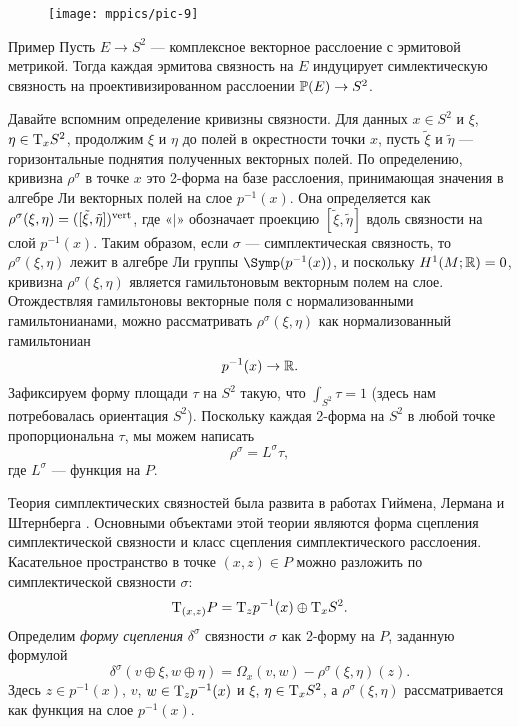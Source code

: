 {

\begin{wrapfigure}[12]{o}{40 mm}
\vskip-0mm
\centering
\texttt{[image: mppics/pic-9]}
\caption{}\label{pic-9}
\vskip0mm
\end{wrapfigure}

\begin{ex*}{Пример}
Пусть $E \to S^2$ — комплексное векторное расслоение с эрмитовой метрикой.
Тогда каждая эрмитова связность на $E$ индуцирует симлектическую связность на проективизированном расслоении $\PP(E)\z\to S^2$.
\end{ex*}

Давайте вспомним определение кривизны связности.
Для данных $x\in S^2$ и $\xi$, $\eta \z\in \T_x S^2$, продолжим $\xi$
и $\eta$ до полей в окрестности точки $x$, 
пусть $\tilde\xi$ и $\tilde\eta$ — горизонтальные поднятия
полученных векторных полей. 
По определению, кривизна $\rho^\sigma$ в точке $x$ это 2-форма на
базе расслоения,
принимающая значения в алгебре Ли векторных полей на слое
$p^{-1}(x)$. 
Она определяется как $\rho^\sigma (\xi, \eta) \z= ([\tilde\xi,
  \tilde\eta])^\vert$, где «$\vert$» обозначает проекцию $[\tilde\xi,
  \tilde\eta]$ вдоль связности на слой $p^{-1} (x)$. 
Таким образом, если $\sigma$ — симплектическая связность, то
$\rho^\sigma (\xi, \eta)$ лежит в алгебре Ли группы
$\Symp(p^{-1}(x))$, и поскольку $H^1 (M;\mathbb{R}) = 0$, кривизна
$\rho^\sigma (\xi, \eta)$ является гамильтоновым векторным полем на
слое. 
Отождествляя гамильтоновы векторные поля с нормализованными
гамильтонианами, можно рассматривать $\rho^\sigma (\xi, \eta)$ как
нормализованный гамильтониан 
\[p^{-1} (x) \to \mathbb{R}.\]
Зафиксируем форму площади $\tau$ на $S^2$ такую, что $\int_{S^2} \tau
= 1$ (здесь нам потребовалась ориентация $S^2$). 
Поскольку каждая 2-форма на $S^2$ в любой точке
пропорциональна $\tau$, мы можем написать
\[\rho^\sigma = L^\sigma \tau,\]
где $L^\sigma$ — функция на $P$.

}

Теория симплектических связностей была развита в работах
Гиймена,
Лермана
и Штернберга \cite{GLS,MS}. 
Основными объектами этой теории являются форма сцепления
симплектической связности и класс сцепления симплектического
расслоения.  
Касательное пространство в точке $(x, z) \in P$ можно разложить по симплектической
связности $\sigma$: 
\[\mathrm{T}_{(x,z)} P = \mathrm{T}_z p^{-1} (x) \oplus \mathrm{T}_x S^2.\]
Определим \emph{форму сцепления} $\delta^\sigma$ связности $\sigma$
как 2-форму на $P$, заданную формулой  
\[\delta^\sigma (v \oplus \xi, w \oplus \eta) = \Omega_x (v, w) -
\rho^\sigma (\xi, \eta)(z).\] 
Здесь $z \in p^{-1} (x)$, $v$, $w \in \mathrm{T}_z p^{-1} (x)$ и $\xi$, $\eta
\in \mathrm{T}_x S^2$, а $\rho^\sigma (\xi, \eta)$ рассматривается как функция
на слое $p^{-1} (x)$. 

